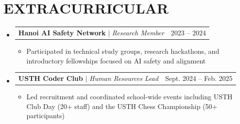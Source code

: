 \documentclass[letterpaper,11pt]{article}
\makeatletter
\newcommand{\resumeItem}[1]{
  \item\small{
    {#1}
  }
}
\newcommand{\resumeProjectHeading}[2]{
    \vspace{-4pt}\item
    \begin{tabular*}{\textwidth}{l@{\extracolsep{\fill}}r}
      #1 & {\color{dark-grey}\small #2} \\
    \end{tabular*}\vspace{-4pt}
}
\newcommand{\resumeSubHeadingListStart}{\begin{itemize}[leftmargin=0in, label={}]}
\newcommand{\resumeSubHeadingListEnd}{\end{itemize}}
\newcommand{\resumeItemListStart}{\begin{itemize}[leftmargin=0.15in, itemsep=1pt]}
\newcommand{\resumeItemListEnd}{\end{itemize}\vspace{-2pt}}
\makeatother
\begin{document}
%
\section{EXTRACURRICULAR}
  \resumeSubHeadingListStart
    \resumeProjectHeading
      {\textbf{Hanoi AI Safety Network} $|$ \emph{Research Member}}{2023 -- 2024}
      \resumeItemListStart
        \resumeItem{Participated in technical study groups, research hackathons, and introductory fellowships focused on AI safety and alignment}
      \resumeItemListEnd
    \resumeProjectHeading
      {\textbf{USTH Coder Club} $|$ \emph{Human Resources Lead}}{Sept. 2024 -- Feb. 2025}
      \resumeItemListStart
        \resumeItem{Led recruitment and coordinated school-wide events including USTH Club Day (20+ staff) and the USTH Chess Championship (50+ participants)}
      \resumeItemListEnd

  \resumeSubHeadingListEnd

\end{document}
